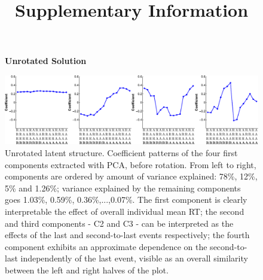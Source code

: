 \documentclass[12pt,letterpaper]{article}
\begin{document}
\title{Supplementary Information}

\date{}

\maketitle

\clearpage

\begin{figure}[t]
\centering
\textbf{Unrotated Solution}\par\medskip
\includegraphics[width=1\textwidth]{unrotated_solution.pdf}
\caption[Unrotated latent structure]{Unrotated latent structure. Coefficient patterns of the four first components extracted with PCA, before rotation. From left to right, components are ordered by amount of variance explained: 78\%, 12\%, 5\% and 1.26\%; variance explained by the remaining components goes 1.03\%, 0.59\%, 0.36\%,...,0.07\%. The first component is clearly interpretable the effect of overall individual mean RT; the second and third components - C2 and C3 - can be interpreted as the effects of the last and second-to-last events respectively; the fourth component exhibits an approximate dependence on the second-to-last independently of the last event, visible as an overall similarity between the left and right halves of the plot.}\label{unrotated_solution}
\end{figure}

\clearpage

\end{document}
